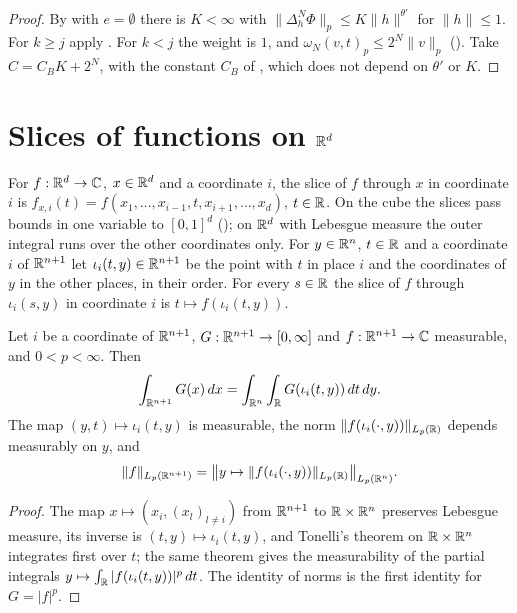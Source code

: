 \begin{proof}
\leanok
{}
By  with $e = \emptyset$ there is $K < \infty$ with
$\|\Delta_h^N \Phi\|_p \leq K \|h\|^{\theta'}$ for $\|h\| \leq 1$. For $k \geq j$ apply
. For $k < j$ the weight is $1$, and
$\omega_N(v, t)_p \leq 2^N \|v\|_p$ (). Take $C = C_B K + 2^N$, with the
constant $C_B$ of , which does not depend on $\theta'$ or $K$.
\end{proof}

\section{Slices of functions on \texorpdfstring{$\mathbb{R}^d$}{R\^{}d}}
\label{sec:rd-slices}

For $f : \mathbb{R}^d \to \mathbb{C}$, $x \in \mathbb{R}^d$ and a coordinate $i$, the slice of $f$ through $x$ in
coordinate $i$ is $f_{x,i}(t) = f(x_1, \dots, x_{i-1}, t, x_{i+1}, \dots, x_d)$, $t \in \mathbb{R}$. On
the cube the slices pass bounds in one variable to $[0, 1]^d$ (); on $\mathbb{R}^d$
with Lebesgue measure the outer integral runs over the other coordinates only. For $y \in \mathbb{R}^n$,
$t \in \mathbb{R}$ and a coordinate $i$ of $\mathbb{R}^{n+1}$ let $\iota_i(t, y) \in \mathbb{R}^{n+1}$ be the point with
$t$ in place $i$ and the coordinates of $y$ in the other places, in their order. For every
$s \in \mathbb{R}$ the slice of $f$ through $\iota_i(s, y)$ in coordinate $i$ is
$t \mapsto f(\iota_i(t, y))$.

\begin{lemma}
\label{lem:rd-slices}
\leanok
Let $i$ be a coordinate of $\mathbb{R}^{n+1}$, $G : \mathbb{R}^{n+1} \to [0, \infty]$ and $f : \mathbb{R}^{n+1} \to \mathbb{C}$
measurable, and $0 < p < \infty$. Then
\[
  \int_{\mathbb{R}^{n+1}} G(x) \, dx = \int_{\mathbb{R}^n} \int_{\mathbb{R}} G(\iota_i(t, y)) \, dt \, dy .
\]
The map $(y, t) \mapsto \iota_i(t, y)$ is measurable, the norm
$\|f(\iota_i(\cdot, y))\|_{L_p(\mathbb{R})}$ depends measurably on $y$, and
\[
  \|f\|_{L_p(\mathbb{R}^{n+1})}
  = \bigl\| y \mapsto \|f(\iota_i(\cdot, y))\|_{L_p(\mathbb{R})} \bigr\|_{L_p(\mathbb{R}^n)} .
\]
\end{lemma}

\begin{proof}
\leanok
The map $x \mapsto (x_i, (x_l)_{l \neq i})$ from $\mathbb{R}^{n+1}$ to $\mathbb{R} \times \mathbb{R}^n$ preserves
Lebesgue measure, its inverse is $(t, y) \mapsto \iota_i(t, y)$, and Tonelli's theorem on
$\mathbb{R} \times \mathbb{R}^n$ integrates first over $t$; the same theorem gives the measurability of the
partial integrals $y \mapsto \int_{\mathbb{R}} |f(\iota_i(t, y))|^p \, dt$. The identity of norms is the
first identity for $G = |f|^p$.
\end{proof}

